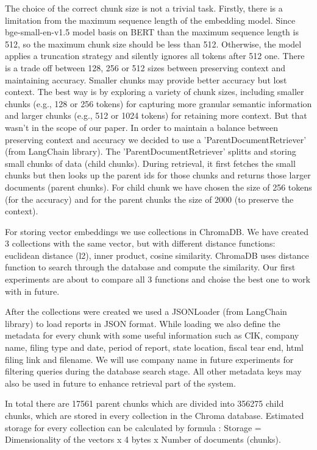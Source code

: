 The choice of the correct chunk size is not a trivial task. Firstly, there is a limitation from the maximum sequence length of the embedding model. Since bge-small-en-v1.5 model basis on BERT than the maximum sequence length is 512, so the maximum chunk size should be less than 512. Otherwise, the model applies a truncation strategy and silently ignores all tokens after 512 one. There is a trade off between 128, 256 or 512 sizes between preserving context and maintaining accuracy. Smaller chunks may provide better accuracy but lost context. The best way is by exploring a variety of chunk sizes, including smaller chunks (e.g., 128 or 256 tokens) for capturing more granular semantic information and larger chunks (e.g., 512 or 1024 tokens) for retaining more context. But that wasn't in the scope of our paper. In order to maintain a balance between preserving context and accuracy we decided to use a  'ParentDocumentRetriever' (from LangChain library). The 'ParentDocumentRetriever' splitts and storing small chunks of data (child chunks). During retrieval, it first fetches the small chunks but then looks up the parent ids for those chunks and returns those larger documents (parent chunks). For child chunk we have chosen the size of 256 tokens (for the accuracy) and for the parent chunks the size of 2000 (to preserve the context). 

For storing vector embeddings we use collections in ChromaDB. We have created 3 collections with the same vector, but with different distance functions: euclidean distance (l2), inner product, cosine similarity. ChromaDB uses distance function to search through the database and compute the similarity. Our first experiments are about to compare all 3 functions and choise the best one to work with in future. 

After the collections were created we used a JSONLoader (from LangChain library) to load reports in JSON format. While loading we also define the metadata for every chunk with some useful information such as CIK, company name, filing type and date, period of report, state location, fiscal tear end, html filing link and filename. We will use company name in future experiments for filtering queries during the database search stage. All other metadata keys may also be used in future to enhance retrieval part of the system.

In total there are 17561 parent chunks which are divided into 356275 child chunks, which are stored in every collection in the Chroma database. Estimated storage for every collection can be calculated by formula \cite{QuentinAnthonyStellaBidermanHaileySchoelkopf.2023}: Storage = Dimensionality of the vectors x 4 bytes x Number of documents (chunks).

